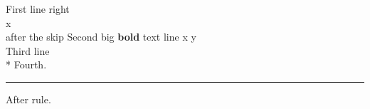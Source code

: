 \documentclass{article}
\begin{document}
First line \hfill right\\ \hfil x\\[3pt] after the skip
Second {\large big \textbf{bold} text} line \quad x \qquad y\\[6pt]
Third line\\*
Fourth.

\vspace{8pt}
\hrule
\vspace{8pt}
After rule.
\end{document}
